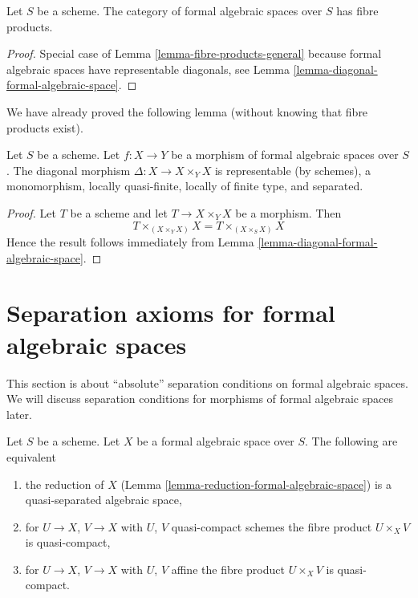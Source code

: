 \begin{lemma}
\label{lemma-fibre-products}
Let $S$ be a scheme. The category of formal algebraic spaces over $S$
has fibre products.
\end{lemma}

\begin{proof}
Special case of Lemma \ref{lemma-fibre-products-general}
because formal algebraic spaces have representable diagonals, see
Lemma \ref{lemma-diagonal-formal-algebraic-space}.
\end{proof}

\noindent
We have already proved the following lemma (without knowing that
fibre products exist).

\begin{lemma}
\label{lemma-diagonal-morphism-formal-algebraic-spaces}
Let $S$ be a scheme. Let $f : X \to Y$ be a morphism of formal algebraic spaces
over $S$. The diagonal morphism $\Delta : X \to X \times_Y X$
is representable (by schemes), a monomorphism, locally quasi-finite,
locally of finite type, and separated.
\end{lemma}

\begin{proof}
Let $T$ be a scheme and let $T \to X \times_Y X$ be a morphism.
Then
$$
T \times_{(X \times_Y X)} X = T \times_{(X \times_S X)} X
$$
Hence the result follows immediately from
Lemma \ref{lemma-diagonal-formal-algebraic-space}.
\end{proof}






\section{Separation axioms for formal algebraic spaces}
\label{section-separation}

\noindent
This section is about ``absolute'' separation conditions on formal algebraic
spaces. We will discuss separation conditions for morphisms of formal
algebraic spaces later.

\begin{lemma}
\label{lemma-characterize-quasi-separated}
Let $S$ be a scheme. Let $X$ be a formal algebraic space over $S$.
The following are equivalent
\begin{enumerate}
\item the reduction of $X$
(Lemma \ref{lemma-reduction-formal-algebraic-space}) is a
quasi-separated algebraic space,
\item for $U \to X$, $V \to X$ with $U$, $V$ quasi-compact schemes
the fibre product $U \times_X V$ is quasi-compact,
\item for $U \to X$, $V \to X$ with $U$, $V$ affine
the fibre product $U \times_X V$ is quasi-compact.
\end{enumerate}
\end{lemma}

